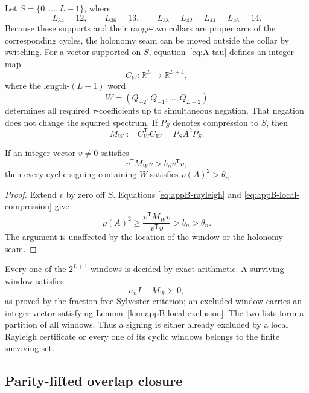 Let \(S=\{0,\ldots,L-1\}\), where
\begin{equation}\label{eq:appB-support-lengths}
 L_{34}=12,\qquad L_{36}=13,\qquad
 L_{38}=L_{42}=L_{44}=L_{46}=14.
\end{equation}
Because these supports and their range-two collars are proper arcs of the
corresponding cycles, the holonomy seam can be moved outside the collar by
switching.  For a vector supported on \(S\), equation~\eqref{eq:A-tau}
defines an integer map
\[
 C_W:\mathbb R^L\longrightarrow\mathbb R^{L+4},
\]
where the length-\((L+1)\) word
\[
 W=(Q_{-2},Q_{-1},\ldots,Q_{L-2})
\]
determines all required \(\tau\)-coefficients up to simultaneous negation.
That negation does not change the squared spectrum.  If \(P_S\) denotes
compression to \(S\), then
\begin{equation}\label{eq:appB-local-compression}
 M_W:=C_W^{\mathsf T}C_W=P_SA^2P_S.
\end{equation}

\begin{lemma}\label{lem:appB-local-exclusion}
If an integer vector \(v\ne0\) satisfies
\[
 v^{\mathsf T}M_Wv>b_n v^{\mathsf T}v,
\]
then every cyclic signing containing \(W\) satisfies
\(\rho(A)^2>\theta_n\).
\end{lemma}

\begin{proof}
Extend \(v\) by zero off \(S\).  Equations
\eqref{eq:appB-rayleigh} and \eqref{eq:appB-local-compression} give
\[
 \rho(A)^2\geq
 \frac{v^{\mathsf T}M_Wv}{v^{\mathsf T}v}
 >b_n>\theta_n.
\]
The argument is unaffected by the location of the window or the holonomy
seam.
\end{proof}

Every one of the \(2^{L+1}\) windows is decided by exact arithmetic.  A
surviving window satisfies
\[
 a_nI-M_W\succ0,
\]
as proved by the fraction-free Sylvester criterion; an excluded window carries an
integer vector satisfying Lemma~\ref{lem:appB-local-exclusion}.  The two
lists form a partition of all windows.  Thus a signing is either already
excluded by a local Rayleigh certificate or every one of its cyclic windows
belongs to the finite surviving set.

\subsection{Parity-lifted overlap closure}
\label{app:parity-overlap}

